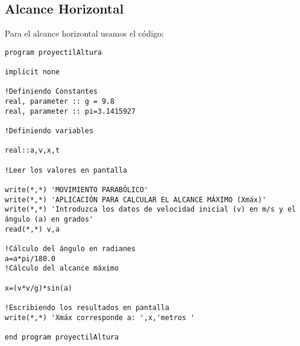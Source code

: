\documentclass[12pt,a4paper]{article}
\begin{document}
\subsection{Alcance Horizontal}
Para el alcance horizontal usamos el código:
\begin{verbatim}
program proyectilAltura

implicit none

!Definiendo Constantes
real, parameter :: g = 9.8
real, parameter :: pi=3.1415927

!Definiendo variables

real::a,v,x,t

!Leer los valores en pantalla

write(*,*) 'MOVIMIENTO PARABÓLICO'
write(*,*) 'APLICACIÓN PARA CALCULAR EL ALCANCE MÁXIMO (Xmáx)'
write(*,*) 'Introduzca los datos de velocidad inicial (v) en m/s y el ángulo (a) en grados'
read(*,*) v,a

!Cálculo del ángulo en radianes
a=a*pi/180.0
!Cálculo del alcance máximo

x=(v*v/g)*sin(a)

!Escribiendo los resultados en pantalla
write(*,*) 'Xmáx corresponde a: ',x,'metros '

end program proyectilAltura

\end{verbatim}
\end{document}
